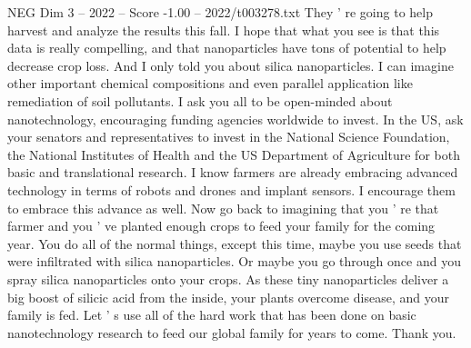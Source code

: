 \begin{textsample}{NEG Dim 3 – 2022 – Score -1.00 – 2022/t003278.txt}
They ' re going to help harvest and analyze the results this fall.
I hope that what you see is that this data is really compelling, and that nanoparticles have tons of potential to help decrease crop loss.
And I only told you about silica nanoparticles.
I can imagine other important chemical compositions and even parallel application like remediation of soil pollutants.
I ask you all to be open-minded about nanotechnology, encouraging funding agencies worldwide to invest.
In the US, ask your senators and representatives to invest in the National Science Foundation, the National Institutes of Health and the US Department of Agriculture for both basic and translational research.
I know farmers are already embracing advanced technology in terms of robots and drones and implant sensors.
I encourage them to embrace this advance as well.
Now go back to imagining that you ' re that farmer and you ' ve planted enough crops to feed your family for the coming year.
You do all of the normal things, except this time, maybe you use seeds that were infiltrated with silica nanoparticles.
Or maybe you go through once and you spray silica nanoparticles onto your crops.
As these tiny nanoparticles deliver a big boost of silicic acid from the inside, your plants overcome disease, and your family is fed.
Let ' s use all of the hard work that has been done on basic nanotechnology research to feed our global family for years to come.
Thank you.

\end{textsample}
